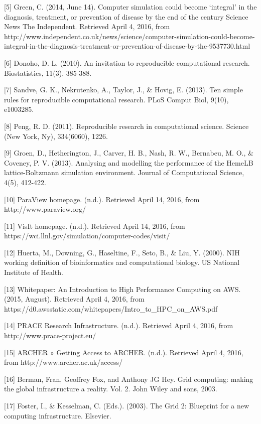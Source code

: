 \documentclass[]{article}
\begin{document}
{[}5{]} Green, C. (2014, June 14). Computer simulation could become
`integral' in the diagnosis, treatment, or prevention of disease by the
end of the century \textbar{} Science \textbar{} News \textbar{} The
Independent. Retrieved April 4, 2016, from
http://www.independent.co.uk/news/science/computer-simulation-could-become-integral-in-the-diagnosis-treatment-or-prevention-of-disease-by-the-9537730.html

{[}6{]} Donoho, D. L. (2010). An invitation to reproducible
computational research. Biostatistics, 11(3), 385-388.

{[}7{]} Sandve, G. K., Nekrutenko, A., Taylor, J., \& Hovig, E. (2013).
Ten simple rules for reproducible computational research. PLoS Comput
Biol, 9(10), e1003285.

{[}8{]} Peng, R. D. (2011). Reproducible research in computational
science. Science (New York, Ny), 334(6060), 1226.

{[}9{]} Groen, D., Hetherington, J., Carver, H. B., Nash, R. W.,
Bernabeu, M. O., \& Coveney, P. V. (2013). Analysing and modelling the
performance of the HemeLB lattice-Boltzmann simulation environment.
Journal of Computational Science, 4(5), 412-422.

{[}10{]} ParaView homepage. (n.d.). Retrieved April 14, 2016, from
http://www.paraview.org/

{[}11{]} VisIt homepage. (n.d.). Retrieved April 14, 2016, from
https://wci.llnl.gov/simulation/computer-codes/visit/

{[}12{]} Huerta, M., Downing, G., Haseltine, F., Seto, B., \& Liu, Y.
(2000). NIH working definition of bioinformatics and computational
biology. US National Institute of Health.

{[}13{]} Whitepaper: An Introduction to High Performance Computing on
AWS. (2015, August). Retrieved April 4, 2016, from
https://d0.awsstatic.com/whitepapers/Intro\_to\_HPC\_on\_AWS.pdf

{[}14{]} PRACE Research Infrastructure. (n.d.). Retrieved April 4, 2016,
from http://www.prace-project.eu/

{[}15{]} ARCHER » Getting Access to ARCHER. (n.d.). Retrieved April 4,
2016, from http://www.archer.ac.uk/access/

{[}16{]} Berman, Fran, Geoffrey Fox, and Anthony JG Hey. Grid computing:
making the global infrastructure a reality. Vol. 2. John Wiley and sons,
2003.

{[}17{]} Foster, I., \& Kesselman, C. (Eds.). (2003). The Grid 2:
Blueprint for a new computing infrastructure. Elsevier.
\end{document}
